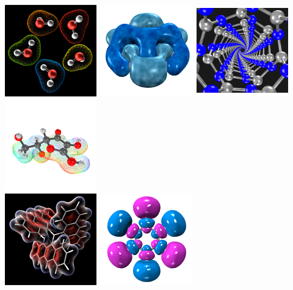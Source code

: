 \documentclass[a4paper,12pt]{article}
\begin{document}
\begin{center}
\includegraphics[scale=0.58]{figures/gallery/g11_sm.png}\
\includegraphics[scale=0.58]{figures/gallery/g12_sm.png}\
\includegraphics[scale=0.58]{figures/gallery/g17_sm.png}\
\includegraphics[scale=0.58]{figures/gallery/g25_sm.png} \\
\includegraphics[scale=0.58]{figures/gallery/g1_sm.png}\
\includegraphics[scale=0.58]{figures/gallery/g4_sm.png}\

\end{center}
\end{document}
